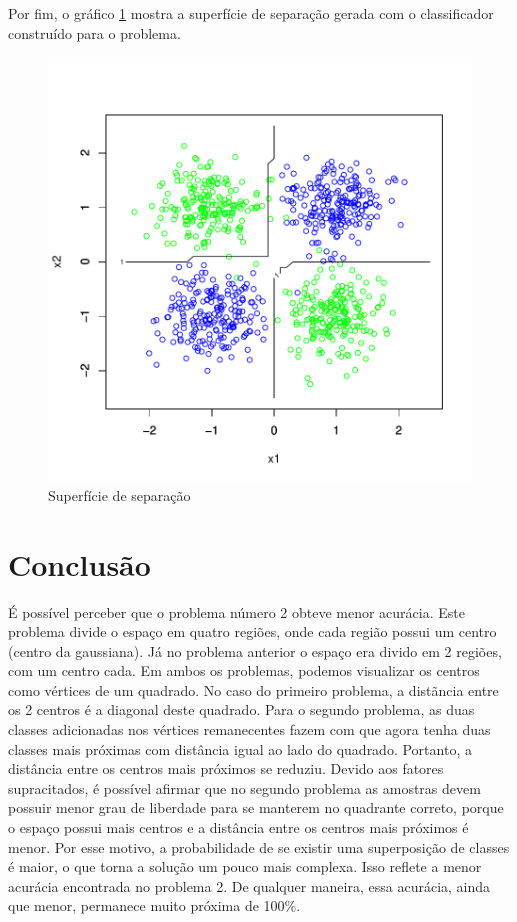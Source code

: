 \documentclass[12pt]{article}
\begin{document}
\par Por fim, o gráfico \ref{sup2} mostra a superfície de separação gerada com o classificador construído para o problema.

\begin{figure}[h]
\centering
\includegraphics{BayesClassifier-013}
\caption{Superfície de separação}
\label{sup2}
\end{figure}

\section{Conclusão}
  \par É possível perceber que o problema número 2 obteve menor acurácia. Este problema divide o espaço em quatro regiões, onde cada região possui um centro (centro da gaussiana). Já no problema anterior o espaço era divido em 2 regiões, com um centro cada. Em ambos os problemas, podemos visualizar os centros como vértices de um quadrado. No caso do primeiro problema, a distãncia entre os 2 centros é a diagonal deste quadrado. Para o segundo problema, as duas classes adicionadas nos vértices remanecentes fazem com que agora tenha duas classes mais próximas com distância igual ao lado do quadrado. Portanto, a distância entre os centros mais próximos se reduziu. Devido aos fatores supracitados, é possível afirmar que no segundo problema as amostras devem possuir menor grau de liberdade para se manterem no quadrante correto, porque o espaço possui mais centros e a distância entre os centros mais próximos é menor. Por esse motivo, a probabilidade de se existir uma superposição de classes é maior, o que torna a solução um pouco mais complexa. Isso reflete a menor acurácia encontrada no problema 2. De qualquer maneira, essa acurácia, ainda que menor, permanece muito próxima de 100\%.
  
\end{document}
